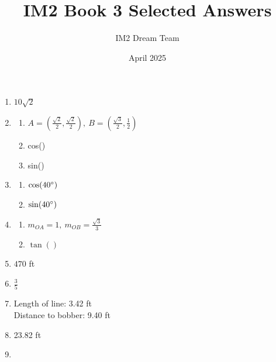 \documentclass{article}
\title{IM2 Book 3 Selected Answers}
\author{IM2 Dream Team}
\date{April 2025}
\begin{document}
\maketitle

\begin{enumerate}

\item $10 \sqrt{2}$

\item 

	\begin{enumerate}
	
	\item $A = \left( \frac{\sqrt{2}}{2},  \frac{\sqrt{2}}{2} \right), \ B = \left( \frac{\sqrt{3}}{2}, \frac{1}{2} \right)$
	
	\item cos()
	
	\item sin()
	
	\end{enumerate}

\item

	\begin{enumerate}
	
	\item $\cos (40 \degree)$
	
	\item $\sin (40 \degree)$
	
	\end{enumerate}
	
\item

	\begin{enumerate}
	
	\item $m_{OA} = 1, \ m_{OB} = \frac{\sqrt{3}}{3}$
	
	\item $\tan()$
	
	\end{enumerate}
	
\item $470$ ft

\item $\frac{3}{5}$

\item Length of line: 3.42 ft \\ Distance to bobber: 9.40 ft

\item 23.82 ft

\item 


\end{enumerate}
\end{document}
